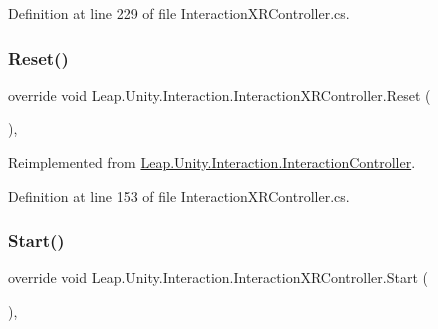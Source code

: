 Definition at line 229 of file Interaction\+X\+R\+Controller.\+cs.

\mbox{\label{class_leap_1_1_unity_1_1_interaction_1_1_interaction_x_r_controller_a17a8608c8d69b586256fbcb9877394b3}} 
\subsubsection{\texorpdfstring{Reset()}{Reset()}}
{\footnotesize\ttfamily override void Leap.\+Unity.\+Interaction.\+Interaction\+X\+R\+Controller.\+Reset (\begin{DoxyParamCaption}{ }\end{DoxyParamCaption})\hspace{0.3cm}{\ttfamily [protected]}, {\ttfamily [virtual]}}



Reimplemented from \mbox{\hyperlink{class_leap_1_1_unity_1_1_interaction_1_1_interaction_controller_a593d87fbcfe464b2308a56a60b4796d5}{Leap.\+Unity.\+Interaction.\+Interaction\+Controller}}.



Definition at line 153 of file Interaction\+X\+R\+Controller.\+cs.

\mbox{\label{class_leap_1_1_unity_1_1_interaction_1_1_interaction_x_r_controller_ac50b109d0cd82bb14cd8a19199850c9e}} 
\subsubsection{\texorpdfstring{Start()}{Start()}}
{\footnotesize\ttfamily override void Leap.\+Unity.\+Interaction.\+Interaction\+X\+R\+Controller.\+Start (\begin{DoxyParamCaption}{ }\end{DoxyParamCaption})\hspace{0.3cm}{\ttfamily [protected]}, {\ttfamily [virtual]}}



